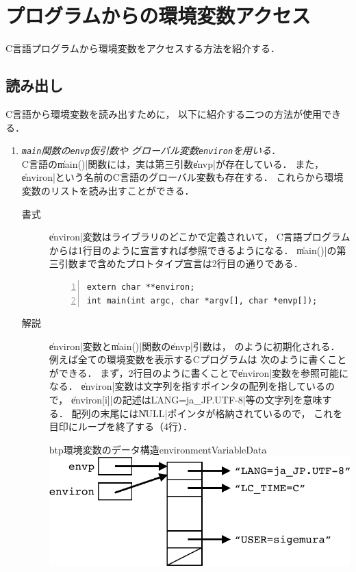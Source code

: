 \section{プログラムからの環境変数アクセス}
C言語プログラムから環境変数をアクセスする方法を紹介する．

\subsection{読み出し}
C言語から環境変数を読み出すために，
以下に紹介する二つの方法が使用できる．

\begin{enumerate}
\item \emph{\texttt{main}関数の\texttt{envp}仮引数や
  グローバル変数\texttt{environ}を用いる．} \\
  C言語の\|main()|関数には，実は第三引数\|envp|が存在している．
  また，\|environ|という名前のC言語のグローバル変数も存在する．
  これらから環境変数のリストを読み出すことができる．

  \begin{description}
  \item [書式]
    \|environ|変数はライブラリのどこかで定義されいて，
    C言語プログラムからは1行目のように宣言すれば参照できるようになる．
    \|main()|の第三引数まで含めたプロトタイプ宣言は2行目の通りである．

\begin{lstlisting}[numbers=left]
extern char **environ;
int main(int argc, char *argv[], char *envp[]);
\end{lstlisting}

  \item [解説]
    \|environ|変数と\|main()|関数の\|envp|引数は，
    のように初期化される．
    例えば全ての環境変数を表示するCプログラムは
    次のように書くことができる．
    まず，2行目のように書くことで\|environ|変数を参照可能になる．
    \|environ|変数は文字列を指すポインタの配列を指しているので，
    \|environ[i]|の記述は\|LANG=ja_JP.UTF-8|等の文字列を意味する．
    配列の末尾には\|NULL|ポインタが格納されているので，
    これを目印にループを終了する（4行）．

    \begin{myfig}{btp}{環境変数のデータ構造}{environmentVariableData}
      \includegraphics[scale=0.8]{Fig/environmentVariableData-crop.pdf}
    \end{myfig}


\end{description}
\end{enumerate}
